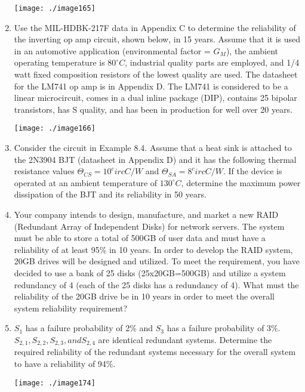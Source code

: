 \begin{enumerate}
\texttt{[image: ./image165]}

\item
  Use the MIL-HDBK-217F data in Appendix C to determine the reliability
  of the inverting op amp circuit, shown below, in 15 years. Assume that
  it is used in an automotive application (environmental factor =
 $G_M$), the ambient operating temperature is
$80^\circ C$, industrial quality parts are employed, and 1/4
  watt fixed composition resistors of the lowest quality are used. The
  datasheet for the LM741 op amp is in Appendix D. The LM741 is
  considered to be a linear microcircuit, comes in a dual inline package
  (DIP), contains 25 bipolar transistors, has S quality, and has been in
  production for well over 20 years.

\texttt{[image: ./image166]}

\item
  Consider the circuit in Example 8.4. Assume that a heat sink is
  attached to the 2N3904 BJT (datasheet in Appendix D) and it has the
  following thermal resistance values
$\Theta_{CS} = 10^circ C/W$ and $\Theta_{SA} = 8 ^circ C/W$. 
If the device is operated at
  an ambient temperature of $130^\circ C$, determine the maximum power
  dissipation of the BJT and its reliability in 50 years.
\item
  Your company intends to design, manufacture, and market a new RAID
  (Redundant Array of Independent Disks) for network servers. The system
  must be able to store a total of 500GB of user data and must have a
  reliability of at least 95\% in 10 years. In order to develop the RAID
  system, 20GB drives will be designed and utilized. To meet the
  requirement, you have decided to use a bank of 25 disks
  (25x20GB=500GB) and utilize a system redundancy of 4 (each of the 25
  disks has a redundancy of 4). What must the reliability of the 20GB
  drive be in 10 years in order to meet the overall system reliability
  requirement?
  
  
\item
  $S_1$ has a failure probability of  2\% and $S_3$ has a failure
  probability of 3\%. $S_{2,1}, S_{2,2}, S_{2,3}, and S_{2,4}$   
   are identical redundant
  systems. Determine the required reliability of the redundant systems
  necessary for the overall system to have a reliability of 94\%.

\texttt{[image: ./image174]}


\end{enumerate}
